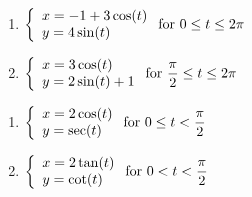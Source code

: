 \documentclass{ximera}
\begin{document}
\begin{multicols}{2} \raggedcolumns 
\begin{enumerate}
\setcounter{enumi}{\value{HW}}

\item ${\displaystyle \left\{ \begin{array}{l} x = -1+ 3\cos(t) \\ y = 4\sin(t) \end{array} \right. \vspace{.25in} \mbox{for } 0 \leq t \leq 2\pi}$
\item ${\displaystyle \left\{ \begin{array}{l} x = 3\cos(t) \\ y = 2\sin(t)+1 \end{array} \right. \vspace{.25in} \mbox{for } \dfrac{\pi}{2} \leq t \leq 2\pi}$

\setcounter{HW}{\value{enumi}}
\end{enumerate}
\end{multicols}

\begin{multicols}{2} \raggedcolumns 
\begin{enumerate}
\setcounter{enumi}{\value{HW}}

\item ${\displaystyle \left\{ \begin{array}{l} x = 2\cos(t) \\ y = \sec(t) \end{array} \right. \vspace{.25in} \mbox{for } 0 \leq t < \dfrac{\pi}{2}}$
\item ${\displaystyle \left\{ \begin{array}{l} x = 2\tan(t) \\ y = \cot(t) \end{array} \right. \vspace{.25in} \mbox{for } 0 < t < \dfrac{\pi}{2}}$

\setcounter{HW}{\value{enumi}}
\end{enumerate}
\end{multicols}
\end{document}
